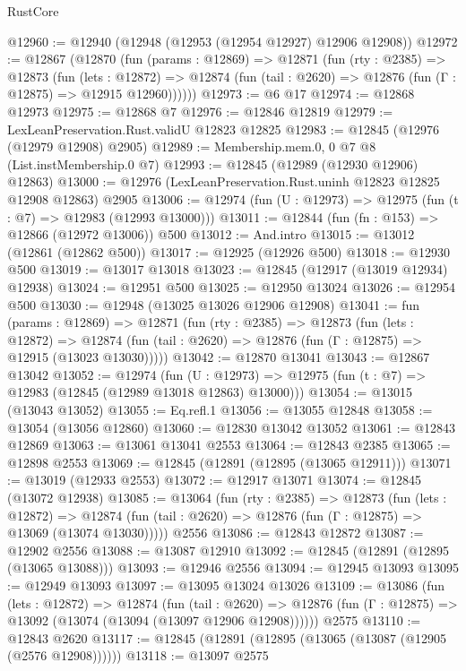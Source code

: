 \begin{lexlean}{RustCore}
\begin{coremodule}
@12960 := @12940 (@12948 (@12953 (@12954 @12927) @12906 @12908))
@12972 := @12867
    (@12870
      (fun (params : @12869) =>
      @12871
        (fun (rty : @2385) =>
        @12873
          (fun (lets : @12872) =>
          @12874 (fun (tail : @2620) => @12876 (fun (Γ : @12875) => @12915 @12960))))))
@12973 := @6 @17
@12974 := @12868 @12973
@12975 := @12868 @7
@12976 := @12846 @12819
@12979 := LexLeanPreservation.Rust.validU @12823 @12825
@12983 := @12845 (@12976 (@12979 @12908) @2905)
@12989 := Membership.mem.{0, 0} @7 @8 (List.instMembership.{0} @7)
@12993 := @12845 (@12989 (@12930 @12906) @12863)
@13000 := @12976 (LexLeanPreservation.Rust.uninh @12823 @12825 @12908 @12863) @2905
@13006 := @12974 (fun (U : @12973) => @12975 (fun (t : @7) => @12983 (@12993 @13000)))
@13011 := @12844 (fun (fn : @153) => @12866 (@12972 @13006)) @500
@13012 := And.intro
@13015 := @13012 (@12861 (@12862 @500))
@13017 := @12925 (@12926 @500)
@13018 := @12930 @500
@13019 := @13017 @13018
@13023 := @12845 (@12917 (@13019 @12934) @12938)
@13024 := @12951 @500
@13025 := @12950 @13024
@13026 := @12954 @500
@13030 := @12948 (@13025 @13026 @12906 @12908)
@13041 := fun (params : @12869) =>
  @12871
    (fun (rty : @2385) =>
    @12873
      (fun (lets : @12872) =>
      @12874 (fun (tail : @2620) => @12876 (fun (Γ : @12875) => @12915 (@13023 @13030)))))
@13042 := @12870 @13041
@13043 := @12867 @13042
@13052 := @12974
    (fun (U : @12973) => @12975 (fun (t : @7) => @12983 (@12845 (@12989 @13018 @12863) @13000)))
@13054 := @13015 (@13043 @13052)
@13055 := Eq.refl.{1}
@13056 := @13055 @12848
@13058 := @13054 (@13056 @12860)
@13060 := @12830 @13042 @13052
@13061 := @12843 @12869
@13063 := @13061 @13041 @2553
@13064 := @12843 @2385
@13065 := @12898 @2553
@13069 := @12845 (@12891 (@12895 (@13065 @12911)))
@13071 := @13019 (@12933 @2553)
@13072 := @12917 @13071
@13074 := @12845 (@13072 @12938)
@13085 := @13064
    (fun (rty : @2385) =>
    @12873
      (fun (lets : @12872) =>
      @12874 (fun (tail : @2620) => @12876 (fun (Γ : @12875) => @13069 (@13074 @13030)))))
    @2556
@13086 := @12843 @12872
@13087 := @12902 @2556
@13088 := @13087 @12910
@13092 := @12845 (@12891 (@12895 (@13065 @13088)))
@13093 := @12946 @2556
@13094 := @12945 @13093
@13095 := @12949 @13093
@13097 := @13095 @13024 @13026
@13109 := @13086
    (fun (lets : @12872) =>
    @12874
      (fun (tail : @2620) =>
      @12876 (fun (Γ : @12875) => @13092 (@13074 (@13094 (@13097 @12906 @12908))))))
    @2575
@13110 := @12843 @2620
@13117 := @12845 (@12891 (@12895 (@13065 (@13087 (@12905 (@2576 @12908))))))
@13118 := @13097 @2575

\end{coremodule}
\end{lexlean}
